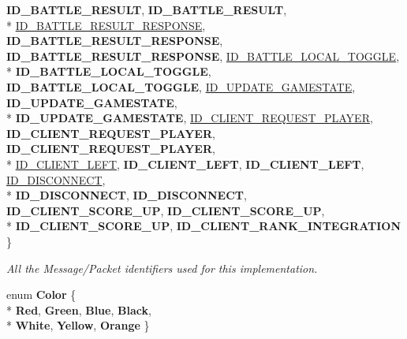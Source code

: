 \begin{DoxyCompactItemize}
{\bfseries I\-D\-\_\-\-B\-A\-T\-T\-L\-E\-\_\-\-R\-E\-S\-U\-L\-T}, 
{\bfseries I\-D\-\_\-\-B\-A\-T\-T\-L\-E\-\_\-\-R\-E\-S\-U\-L\-T}, 
\\*
\hyperlink{namespace_champ_net_plugin_a2ade5cfa7cf6c25ab7236c6b54a57821a0400430dae2bfdb56c3c5be84d5fc2b1}{I\-D\-\_\-\-B\-A\-T\-T\-L\-E\-\_\-\-R\-E\-S\-U\-L\-T\-\_\-\-R\-E\-S\-P\-O\-N\-S\-E}, 
{\bfseries I\-D\-\_\-\-B\-A\-T\-T\-L\-E\-\_\-\-R\-E\-S\-U\-L\-T\-\_\-\-R\-E\-S\-P\-O\-N\-S\-E}, 
{\bfseries I\-D\-\_\-\-B\-A\-T\-T\-L\-E\-\_\-\-R\-E\-S\-U\-L\-T\-\_\-\-R\-E\-S\-P\-O\-N\-S\-E}, 
\hyperlink{namespace_champ_net_plugin_a2ade5cfa7cf6c25ab7236c6b54a57821a01d87e1852357f746b5c583c76db4e23}{I\-D\-\_\-\-B\-A\-T\-T\-L\-E\-\_\-\-L\-O\-C\-A\-L\-\_\-\-T\-O\-G\-G\-L\-E}, 
\\*
{\bfseries I\-D\-\_\-\-B\-A\-T\-T\-L\-E\-\_\-\-L\-O\-C\-A\-L\-\_\-\-T\-O\-G\-G\-L\-E}, 
{\bfseries I\-D\-\_\-\-B\-A\-T\-T\-L\-E\-\_\-\-L\-O\-C\-A\-L\-\_\-\-T\-O\-G\-G\-L\-E}, 
\hyperlink{namespace_champ_net_plugin_a2ade5cfa7cf6c25ab7236c6b54a57821a6c390584862af2434c946e375365fe02}{I\-D\-\_\-\-U\-P\-D\-A\-T\-E\-\_\-\-G\-A\-M\-E\-S\-T\-A\-T\-E}, 
{\bfseries I\-D\-\_\-\-U\-P\-D\-A\-T\-E\-\_\-\-G\-A\-M\-E\-S\-T\-A\-T\-E}, 
\\*
{\bfseries I\-D\-\_\-\-U\-P\-D\-A\-T\-E\-\_\-\-G\-A\-M\-E\-S\-T\-A\-T\-E}, 
\hyperlink{namespace_champ_net_plugin_a2ade5cfa7cf6c25ab7236c6b54a57821a95ea635e1f4775e77d635b7039a9711e}{I\-D\-\_\-\-C\-L\-I\-E\-N\-T\-\_\-\-R\-E\-Q\-U\-E\-S\-T\-\_\-\-P\-L\-A\-Y\-E\-R}, 
{\bfseries I\-D\-\_\-\-C\-L\-I\-E\-N\-T\-\_\-\-R\-E\-Q\-U\-E\-S\-T\-\_\-\-P\-L\-A\-Y\-E\-R}, 
{\bfseries I\-D\-\_\-\-C\-L\-I\-E\-N\-T\-\_\-\-R\-E\-Q\-U\-E\-S\-T\-\_\-\-P\-L\-A\-Y\-E\-R}, 
\\*
\hyperlink{namespace_champ_net_plugin_a2ade5cfa7cf6c25ab7236c6b54a57821a170a6a655b34086567c4039a8e9ba81d}{I\-D\-\_\-\-C\-L\-I\-E\-N\-T\-\_\-\-L\-E\-F\-T}, 
{\bfseries I\-D\-\_\-\-C\-L\-I\-E\-N\-T\-\_\-\-L\-E\-F\-T}, 
{\bfseries I\-D\-\_\-\-C\-L\-I\-E\-N\-T\-\_\-\-L\-E\-F\-T}, 
\hyperlink{namespace_champ_net_plugin_a2ade5cfa7cf6c25ab7236c6b54a57821ab64ca706dd3c8029ea9dc9a239237e15}{I\-D\-\_\-\-D\-I\-S\-C\-O\-N\-N\-E\-C\-T}, 
\\*
{\bfseries I\-D\-\_\-\-D\-I\-S\-C\-O\-N\-N\-E\-C\-T}, 
{\bfseries I\-D\-\_\-\-D\-I\-S\-C\-O\-N\-N\-E\-C\-T}, 
{\bfseries I\-D\-\_\-\-C\-L\-I\-E\-N\-T\-\_\-\-S\-C\-O\-R\-E\-\_\-\-U\-P}, 
{\bfseries I\-D\-\_\-\-C\-L\-I\-E\-N\-T\-\_\-\-S\-C\-O\-R\-E\-\_\-\-U\-P}, 
\\*
{\bfseries I\-D\-\_\-\-C\-L\-I\-E\-N\-T\-\_\-\-S\-C\-O\-R\-E\-\_\-\-U\-P}, 
{\bfseries I\-D\-\_\-\-C\-L\-I\-E\-N\-T\-\_\-\-R\-A\-N\-K\-\_\-\-I\-N\-T\-E\-G\-R\-A\-T\-I\-O\-N}
 \}
\begin{DoxyCompactList}\small\item\em All the Message/\-Packet identifiers used for this implementation. \end{DoxyCompactList}\item 
enum {\bfseries Color} \{ \\*
{\bfseries Red}, 
{\bfseries Green}, 
{\bfseries Blue}, 
{\bfseries Black}, 
\\*
{\bfseries White}, 
{\bfseries Yellow}, 
{\bfseries Orange}
 \}
\end{DoxyCompactItemize}

